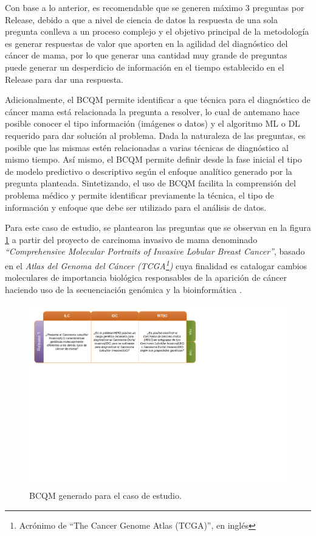 Con base a lo anterior, es recomendable que se generen máximo 3 preguntas por Release, debido a que a nivel de ciencia de datos la respuesta de una sola pregunta conlleva a un proceso complejo y el objetivo principal de la metodología es generar respuestas de valor que aporten en la agilidad del diagnóstico del cáncer de mama, por lo que generar una cantidad muy grande de preguntas puede generar un desperdicio de información en el tiempo establecido en el Release para dar una respuesta.

Adicionalmente, el BCQM permite identificar a que técnica para el diagnóstico de cáncer mama está relacionada la pregunta a resolver, lo cual de antemano hace posible conocer el tipo información (imágenes o datos) y el algoritmo ML o DL requerido para dar solución al problema. Dada la naturaleza de las preguntas, es posible que las mismas estén relacionadas a varias técnicas de diagnóstico al mismo tiempo. Así mismo, el BCQM permite definir desde la fase inicial el tipo de modelo predictivo o descriptivo según el enfoque analítico generado por la pregunta planteada. Sintetizando, el uso de BCQM facilita la comprensión del problema médico y permite identificar previamente la técnica, el tipo de información y enfoque que debe ser utilizado para el análisis de datos.  

Para este caso de estudio, se plantearon las preguntas que se observan en la figura \ref{BCQ_TCGA} a partir del proyecto de carcinoma invasivo de mama denominado \textit{“Comprehensive Molecular Portraits of Invasive Lobular Breast Cancer”}\cite{Ciriello2015}, basado en el \textit {Atlas del Genoma del Cáncer (TCGA\footnote{Acrónimo de “The Cancer Genome Atlas (TCGA)”, en inglés })} cuya finalidad es catalogar cambios moleculares de importancia biológica responsables de la aparición de cáncer haciendo uso de la secuenciación genómica y la bioinformática \cite{TCGA2023}.
\begin{figure}
	\centering
	\includegraphics[width=1
	\linewidth]{IMAGENES/BCQM_TCGA}
	\caption{BCQM generado para el caso de estudio\cite{DSMBCD-BCQM2023}.}
	\label{BCQ_TCGA}
\end{figure}

